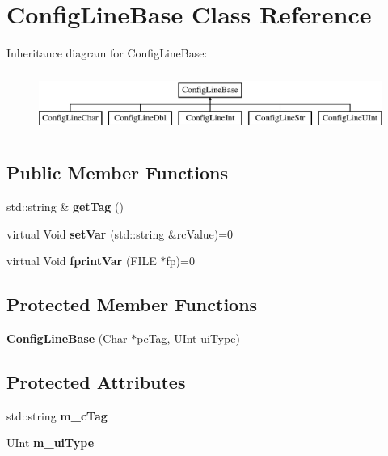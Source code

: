 \hypertarget{class_config_line_base}{}\section{Config\+Line\+Base Class Reference}
\label{class_config_line_base}
Inheritance diagram for Config\+Line\+Base\+:\begin{figure}[H]
\begin{center}
\leavevmode
\includegraphics[height=2.000000cm]{class_config_line_base}
\end{center}
\end{figure}
\subsection*{Public Member Functions}
\begin{DoxyCompactItemize}
\item 
\mbox{\label{class_config_line_base_acfc4ecce0bb944c4c50d87b0968df0aa}} 
std\+::string \& {\bfseries get\+Tag} ()
\item 
\mbox{\label{class_config_line_base_ab39210affb838fa65e8dac41d7417440}} 
virtual Void {\bfseries set\+Var} (std\+::string \&rc\+Value)=0
\item 
\mbox{\label{class_config_line_base_a4ad95e64f5160e1c0ae8090b9b6d7446}} 
virtual Void {\bfseries fprint\+Var} (F\+I\+LE $\ast$fp)=0
\end{DoxyCompactItemize}
\subsection*{Protected Member Functions}
\begin{DoxyCompactItemize}
\item 
\mbox{\label{class_config_line_base_aeb47e5d689f562e8e120e29f6ee628a3}} 
{\bfseries Config\+Line\+Base} (Char $\ast$pc\+Tag, U\+Int ui\+Type)
\end{DoxyCompactItemize}
\subsection*{Protected Attributes}
\begin{DoxyCompactItemize}
\item 
\mbox{\label{class_config_line_base_a72648b01e5694051f91563d5e5563d14}} 
std\+::string {\bfseries m\+\_\+c\+Tag}
\item 
\mbox{\label{class_config_line_base_ae0b24b46d671b58c55756b8bfeb0092e}} 
U\+Int {\bfseries m\+\_\+ui\+Type}
\end{DoxyCompactItemize}


